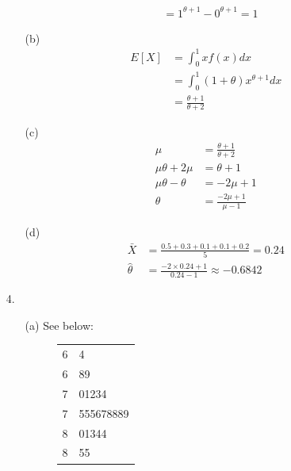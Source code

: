 \documentclass{article}
\begin{document}
\begin{enumerate}
\begin{enumerate}
\begin{equation*}
\begin{aligned}
                           &= 1^{\theta + 1} - 0^{\theta + 1} = 1
        \end{aligned}
        \end{equation*}
    \item [(b)]
        \begin{equation*}
        \begin{aligned}
        E[X] &= \int_0^1 xf(x) dx \\
        &= \int_0^1 (1 + \theta)x^{\theta + 1} dx \\
        &= \frac{\theta + 1}{\theta + 2}
        \end{aligned}
        \end{equation*}
    \item [(c)]
        \begin{equation*}
        \begin{aligned}
        \mu &= \frac{\theta + 1}{\theta + 2} \\
        \mu\theta + 2\mu &= \theta + 1 \\
        \mu\theta - \theta &= -2\mu + 1 \\
        \theta &= \frac{-2\mu + 1}{\mu - 1}
        \end{aligned}
        \end{equation*}
    \item [(d)]
        \begin{equation*}
        \begin{aligned}
        \bar{X} &= \frac{0.5 + 0.3 + 0.1 + 0.1 + 0.2}{5} = 0.24 \\
        \hat{\theta} &= \frac{-2 \times 0.24 + 1}{0.24 - 1} \approx -0.6842
        \end{aligned}
        \end{equation*}
    \end{enumerate}
\item [4.]
    \begin{enumerate}
    \item [(a)] See below:
        \begin{figure}[h]
        \begin{center}
        \begin{tabular}{ r | l }
        6 & 4 \\
        6 & 89 \\
        7 & 01234 \\
        7 & 555678889 \\
        8 & 01344 \\
        8 & 55 \\

\end{tabular}
\end{center}
\end{figure}
\end{enumerate}
\end{enumerate}
\end{document}
